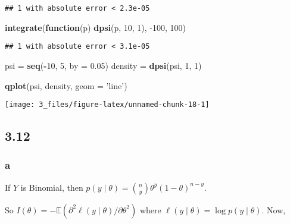 \documentclass[]{article}
\newenvironment{Shaded}{\begin{snugshade}}{\end{snugshade}}
\newcommand{\ControlFlowTok}[1]{\textcolor[rgb]{0.13,0.29,0.53}{\textbf{#1}}}
\newcommand{\DataTypeTok}[1]{\textcolor[rgb]{0.13,0.29,0.53}{#1}}
\newcommand{\DecValTok}[1]{\textcolor[rgb]{0.00,0.00,0.81}{#1}}
\newcommand{\FloatTok}[1]{\textcolor[rgb]{0.00,0.00,0.81}{#1}}
\newcommand{\KeywordTok}[1]{\textcolor[rgb]{0.13,0.29,0.53}{\textbf{#1}}}
\newcommand{\NormalTok}[1]{#1}
\newcommand{\OperatorTok}[1]{\textcolor[rgb]{0.81,0.36,0.00}{\textbf{#1}}}
\newcommand{\StringTok}[1]{\textcolor[rgb]{0.31,0.60,0.02}{#1}}
\begin{document}
\begin{verbatim}
## 1 with absolute error < 2.3e-05
\end{verbatim}

\begin{Shaded}
\begin{Highlighting}[]
\KeywordTok{integrate}\NormalTok{(}\ControlFlowTok{function}\NormalTok{(p) }\KeywordTok{dpsi}\NormalTok{(p, }\DecValTok{10}\NormalTok{, }\DecValTok{1}\NormalTok{), }\DecValTok{-100}\NormalTok{, }\DecValTok{100}\NormalTok{)}
\end{Highlighting}
\end{Shaded}

\begin{verbatim}
## 1 with absolute error < 3.1e-05
\end{verbatim}

\begin{Shaded}
\begin{Highlighting}[]
\NormalTok{psi =}\StringTok{ }\KeywordTok{seq}\NormalTok{(}\OperatorTok{-}\DecValTok{10}\NormalTok{, }\DecValTok{5}\NormalTok{, }\DataTypeTok{by =} \FloatTok{0.05}\NormalTok{)}
\NormalTok{density =}\StringTok{ }\KeywordTok{dpsi}\NormalTok{(psi, }\DecValTok{1}\NormalTok{, }\DecValTok{1}\NormalTok{)}

\KeywordTok{qplot}\NormalTok{(psi, density, }\DataTypeTok{geom =} \StringTok{'line'}\NormalTok{)}
\end{Highlighting}
\end{Shaded}

\begin{center}\texttt{[image: 3\_files/figure-latex/unnamed-chunk-18-1]} \end{center}

\hypertarget{section-7}{%
\subsection{3.12}\label{section-7}}

\hypertarget{a-6}{%
\subsubsection{a}\label{a-6}}

If \(Y\) is Binomial, then
\(p(y \mid \theta) = {n \choose y} \theta^y (1 - \theta)^{n - y}\).

So
\(I(\theta) = -\mathbb{E}(\partial^2 \ell(y \mid \theta) / \partial \theta^2 )\)
where \(\ell(y \mid \theta) = \log p(y \mid \theta)\). Now,
\end{document}
